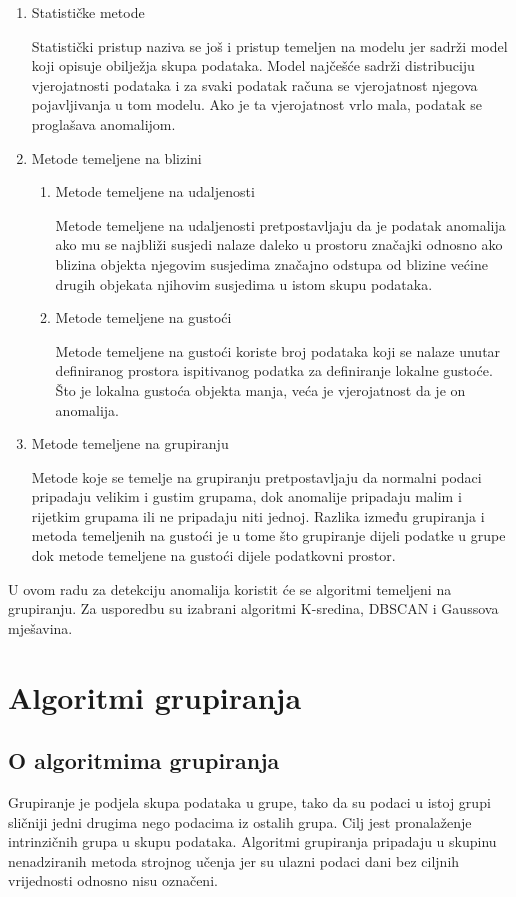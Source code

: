 \documentclass[utf8, diplomski, numeric]{fer}
\begin{document}
\begin{enumerate}
\item Statističke metode

Statistički pristup naziva se još i pristup temeljen na modelu jer sadrži model koji opisuje obilježja skupa podataka. Model najčešće sadrži distribuciju vjerojatnosti podataka i za svaki podatak računa se vjerojatnost njegova pojavljivanja u tom modelu. Ako je ta vjerojatnost vrlo mala, podatak se proglašava anomalijom.
\item Metode temeljene na blizini
\begin{enumerate}
\item Metode temeljene na udaljenosti

Metode temeljene na udaljenosti pretpostavljaju da je podatak anomalija ako mu se najbliži susjedi nalaze daleko u prostoru značajki odnosno ako blizina objekta njegovim susjedima značajno odstupa od blizine većine drugih objekata njihovim susjedima u istom skupu podataka.
\item Metode temeljene na gustoći

Metode temeljene na gustoći koriste broj podataka koji se nalaze unutar definiranog prostora ispitivanog podatka za definiranje lokalne gustoće. Što je lokalna gustoća objekta manja, veća je vjerojatnost da je on anomalija.
\end{enumerate}
\item Metode temeljene na grupiranju

Metode koje se temelje na grupiranju pretpostavljaju da normalni podaci pripadaju velikim i gustim grupama, dok anomalije pripadaju malim i rijetkim grupama ili ne pripadaju niti jednoj. Razlika između grupiranja i metoda temeljenih na gustoći je u tome što grupiranje dijeli podatke u grupe dok metode temeljene na gustoći dijele podatkovni prostor.
\end{enumerate}
U ovom radu za detekciju anomalija koristit će se algoritmi temeljeni na grupiranju. Za usporedbu su izabrani algoritmi K-sredina, DBSCAN i Gaussova mješavina.


\chapter{Algoritmi grupiranja}
\section{O algoritmima grupiranja}
Grupiranje je podjela skupa podataka u grupe, tako da su podaci u istoj grupi sličniji jedni drugima nego podacima iz ostalih grupa. Cilj jest pronalaženje intrinzičnih grupa u skupu podataka. Algoritmi grupiranja pripadaju u skupinu nenadziranih metoda strojnog učenja jer su ulazni podaci dani bez ciljnih vrijednosti odnosno nisu označeni. 
\end{document}
